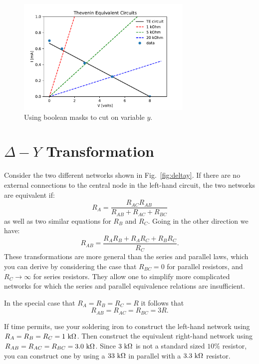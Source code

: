 \begin{figure}[htbp]
\begin{center}
\includegraphics[width=0.75\textwidth]{figs/labs/thevenin/final.pdf} 
\caption{Using boolean masks to cut on variable $y$.}
\label{fig:egthev}
\end{center}
\end{figure}


\section{$\Delta-Y$ Transformation}

Consider the two different networks shown in Fig.~\ref{fig:deltay}.
If there are no external connections to the central node in the
left-hand circuit, the two networks are equivalent if:
\begin{displaymath}
R_{A} = \frac{R_{AC} R_{AB}}{R_{AB} + R_{AC} + R_{BC}}
\end{displaymath}
as well as two similar equations for $R_{B}$ and $R_{C}$.  Going in the other direction we have:
\begin{displaymath}
R_{AB} = \frac{R_{A}R_{B} + R_{A}R_{C} + R_{B}R_{C}}{R_{C}}.
\end{displaymath}
These transformations are more general than the series and parallel
laws, which you can derive by considering the case that $R_{BC}=0$ for
parallel resistors, and $R_{C} \to \infty$ for series resistors.  They
allow one to simplify more complicated networks for which the series and
parallel equivalence relations are insufficient.

In the special case that $R_{A} = R_{B} = R_{C} = R$ it follows that 
\begin{displaymath}
R_{AB} = R_{AC} = R_{BC} = 3 R.
\end{displaymath}

If time permits, use your soldering iron to construct the left-hand
network using $R_{A} = R_{B} = R_{C} = 1~\rm k\Omega$.  Then construct
the equivalent right-hand network using $R_{AB} = R_{AC} = R_{BC} =
3.0~\rm k\Omega$.  Since $3~\rm k\Omega$ is not a standard sized
$10\%$ resistor, you can construct one by using a $33~\rm k\Omega$ in
parallel with a $3.3~\rm k\Omega$ resistor.

